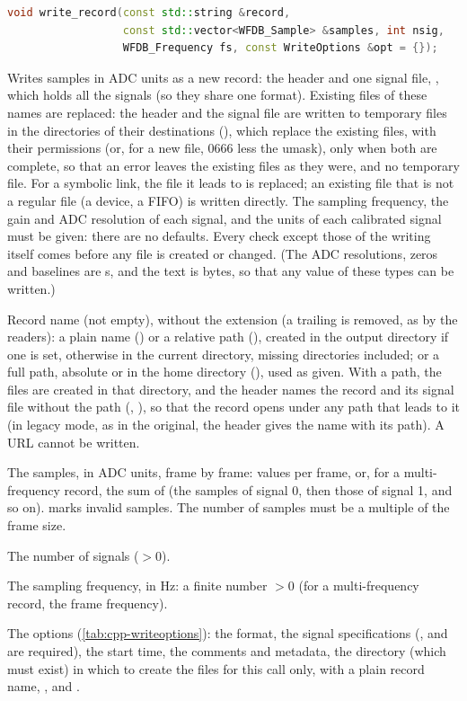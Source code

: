 \begin{lstlisting}[language=C++,style=signature]
void write_record(const std::string &record,
                  const std::vector<WFDB_Sample> &samples, int nsig,
                  WFDB_Frequency fs, const WriteOptions &opt = {});
\end{lstlisting}
Writes samples in ADC units as a new record: the header  and one signal
file, , which holds all the signals (so they share one format). Existing
files of these names are replaced: the header and the signal file are written to
temporary files in the directories of their destinations (),
which replace the existing files, with their permissions (or, for a new file, 0666 less
the umask), only when both are complete, so that an error leaves the existing files as
they were, and no temporary file. For a symbolic link, the file it leads to is replaced;
an existing file that is not a regular file (a device, a FIFO) is written directly. The
sampling frequency, the gain and ADC resolution of each signal, and the units of each
calibrated signal must be given: there are no defaults. Every check except those of the
writing itself comes before any file is created or changed. (The ADC resolutions, zeros
and baselines are s, and the text is bytes, so that any value of these types
can be written.)
\begin{params}
\item[record] Record name (not empty), without the  extension (a trailing
   is removed, as by the readers): a plain name
  () or a relative path (), created in the output directory
  if one is set, otherwise in the current directory, missing directories included; or a
  full path, absolute or in the home directory (),
  used as given. With a path, the files are created in that directory, and the header
  names the record and its signal file without the path (, ), so
  that the record opens under any path that leads to it (in legacy mode, as in the
  original, the header gives the name with its path). A URL cannot be written.
\item[samples] The samples, in ADC units, frame by frame:  values per frame,
  or, for a multi-frequency record, the sum of  (the samples
  of signal 0, then those of signal 1, and so on).  marks
  invalid samples. The number of samples must be a multiple of the frame size.
\item[nsig] The number of signals ($> 0$).
\item[fs] The sampling frequency, in Hz: a finite number $> 0$ (for a multi-frequency
  record, the frame frequency).
\item[opt] The options (\cref{tab:cpp-writeoptions}): the format, the signal
  specifications (,  and  are required), the start
  time, the comments and metadata, the directory  (which must exist) in which
  to create the files for this call only, with a plain record name, , and
  .
\end{params}
